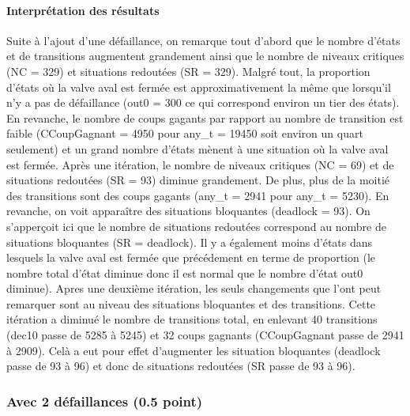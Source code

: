 \documentclass[a4paper]{book}
\begin{document}
\paragraph{Interprétation des résultats}
Suite à l'ajout d'une défaillance, on remarque tout d'abord que le nombre d'états et de transitions augmentent grandement ainsi que le nombre 
de niveaux critiques (NC = 329) et situations redoutées (SR = 329). Malgré tout, la proportion d'états où la valve aval est fermée est approximativement 
la même que lorsqu'il n'y a pas de défaillance (out0 = 300 ce qui correspond environ un tier des états). En revanche, le nombre de coups gagants par rapport 
au nombre de transition est faible (CCoupGagnant = 4950 pour any\_t = 19450 soit environ un quart seulement) et un grand nombre d'états mènent à une situation où 
la valve aval est fermée. 
Après une itération, le nombre de niveaux critiques (NC = 69) et de situations redoutées (SR = 93) diminue grandement. De plus, plus de la moitié des transitions 
sont des coups gagants (any\_t = 2941 pour any\_t = 5230). En revanche, on voit apparaître des situations bloquantes (deadlock = 93). On s'apperçoit ici que le nombre 
de situations redoutées correspond au nombre de situations bloquantes (SR = deadlock). Il y a également moins 
d'états dans lesquels la valve aval est fermée que précédement en terme de proportion (le nombre total d'état diminue donc il est normal que le nombre d'état out0 
diminue).
Apres une deuxième itération, les seuls changements que l'ont peut remarquer sont au niveau des situations bloquantes et des transitions. Cette itération a diminué 
le nombre de transitions total, en enlevant 40 transitions (dec10 passe de 5285 à 5245) et 32 coups gagnants (CCoupGagnant passe de 2941 à 2909). Celà a eut pour  
effet d'augmenter les situation bloquantes (deadlock passe de 93 à 96) et donc de situations redoutées (SR passe de 93 à 96).



\subsubsection{Avec 2 défaillances (0.5 point)}





\end{document}
